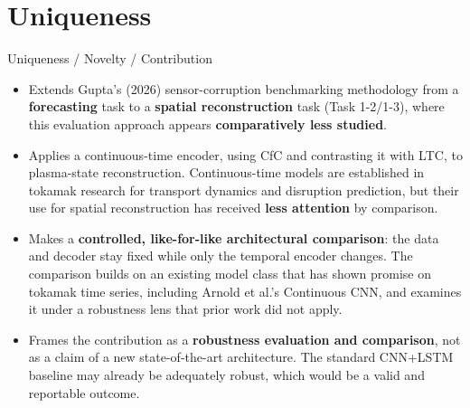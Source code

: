 \documentclass[aspectratio=169]{beamer}
\begin{document}
\section{Uniqueness}
\begin{frame}{Uniqueness / Novelty / Contribution}
  \begin{itemize}
    \item Extends Gupta's (2026) sensor-corruption benchmarking methodology
      from a \textbf{forecasting} task to a \textbf{spatial reconstruction}
      task (Task 1-2/1-3), where this evaluation approach appears
      \textbf{comparatively less studied}.
    \item Applies a continuous-time encoder, using CfC and contrasting it
      with LTC, to plasma-state reconstruction. Continuous-time models are
      established in tokamak research for transport dynamics and disruption
      prediction, but their use for spatial reconstruction has received
      \textbf{less attention} by comparison.
    \item Makes a \textbf{controlled, like-for-like architectural comparison}:
      the data and decoder stay fixed while only the temporal encoder changes.
      The comparison builds on an existing model class that has shown promise
      on tokamak time series, including Arnold et al.'s Continuous CNN, and
      examines it under a robustness lens that prior work did not apply.
    \item Frames the contribution as a \textbf{robustness evaluation and
      comparison}, not as a claim of a new state-of-the-art architecture. The
      standard CNN+LSTM baseline may already be adequately robust, which would
      be a valid and reportable outcome.
  \end{itemize}
\end{frame}

\end{document}
